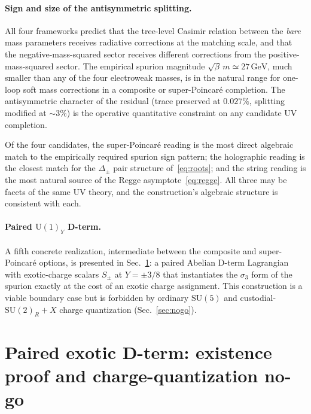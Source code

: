 \documentclass[twocolumn,aps,prd,floatfix,nofootinbib,superscriptaddress,10pt]{article}
\newcommand{\GeV}{\,\mathrm{GeV}}
\begin{document}
\paragraph*{Sign and size of the antisymmetric splitting.} All four frameworks predict that the tree-level Casimir relation between the {\em bare} mass parameters receives radiative corrections at the matching scale, and that the negative-mass-squared sector receives different corrections from the positive-mass-squared sector. The empirical spurion magnitude $\sqrt{\beta}\,m\simeq 27\GeV$, much smaller than any of the four electroweak masses, is in the natural range for one-loop soft mass corrections in a composite or super-Poincar\'e completion. The antisymmetric character of the residual (trace preserved at $0.027\%$, splitting modified at $\sim 3\%$) is the operative quantitative constraint on any candidate UV completion.

Of the four candidates, the super-Poincar\'e reading is the most direct algebraic match to the empirically required spurion sign pattern; the holographic reading is the closest match for the $\Delta_\pm$ pair structure of~\eqref{eq:roots}; and the string reading is the most natural source of the Regge asymptote~\eqref{eq:regge}. All three may be facets of the same UV theory, and the construction's algebraic structure is consistent with each.

\paragraph*{Paired $\mathrm{U}(1)_Y$ D-term.}  A fifth concrete realization, intermediate between the composite and super-Poincar\'e options, is presented in Sec.~\ref{sec:Dterm}: a paired Abelian D-term Lagrangian with exotic-charge scalars $S_\pm$ at $Y=\pm 3/8$ that instantiates the $\sigma_3$ form of the spurion exactly at the cost of an exotic charge assignment.  This construction is a viable boundary case but is forbidden by ordinary $\mathrm{SU}(5)$ and custodial-$\mathrm{SU}(2)_R+X$ charge quantization (Sec.~\ref{sec:nogo}).

\section{Paired exotic D-term: existence proof and charge-quantization no-go}
\label{sec:Dterm}
\end{document}
